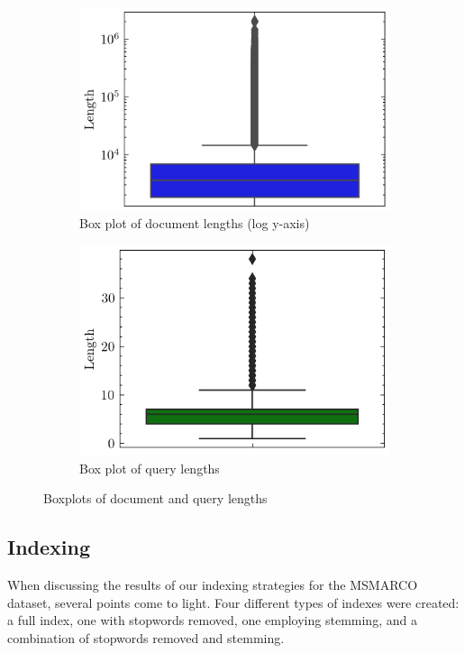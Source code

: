 \documentclass[11pt,a4paper]{article}
\begin{document}
\begin{figure}[ht!]
    \centering
    \begin{subfigure}[b]{0.45\textwidth}
        \includegraphics[width=\textwidth]{media/doc_lengths_boxplot_log_y.png}
        \caption{Box plot of document lengths (log y-axis)}
    \end{subfigure}
    \hfill
    \begin{subfigure}[b]{0.45\textwidth}
        \includegraphics[width=\textwidth]{media/query_lengths_boxplot.png}
        \caption{Box plot of query lengths}
    \end{subfigure}
    \caption{Boxplots of document and query lengths}
\end{figure}

\newpage

\subsection{Indexing}
When discussing the results of our indexing strategies for the
MSMARCO dataset, several points come to light. Four different types
of indexes were created: a full index, one with stopwords removed,
one employing stemming, and a combination of stopwords removed and
stemming.
\end{document}
